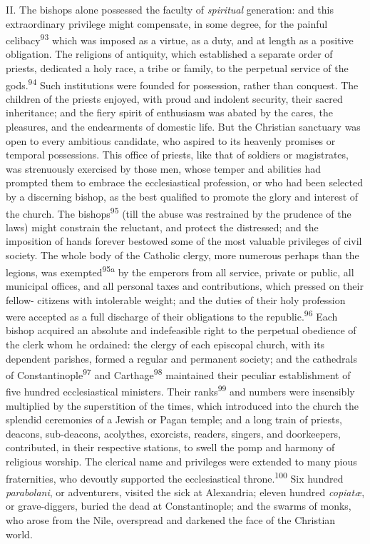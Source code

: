 II. The bishops alone possessed the faculty of \textit{spiritual} generation:
and this extraordinary privilege might compensate, in some degree, for
the painful celibacy\textsuperscript{93} which was imposed as a virtue, as a duty, and
at length as a positive obligation. The religions of antiquity, which
established a separate order of priests, dedicated a holy race, a tribe
or family, to the perpetual service of the gods.\textsuperscript{94} Such institutions
were founded for possession, rather than conquest. The children of the
priests enjoyed, with proud and indolent security, their sacred
inheritance; and the fiery spirit of enthusiasm was abated by the
cares, the pleasures, and the endearments of domestic life. But the
Christian sanctuary was open to every ambitious candidate, who aspired
to its heavenly promises or temporal possessions. This office of
priests, like that of soldiers or magistrates, was strenuously
exercised by those men, whose temper and abilities had prompted them to
embrace the ecclesiastical profession, or who had been selected by a
discerning bishop, as the best qualified to promote the glory and
interest of the church. The bishops\textsuperscript{95} (till the abuse was restrained
by the prudence of the laws) might constrain the reluctant, and protect
the distressed; and the imposition of hands forever bestowed some of
the most valuable privileges of civil society. The whole body of the
Catholic clergy, more numerous perhaps than the legions, was exempted\textsuperscript{95a}
by the emperors from all service, private or public, all
municipal offices, and all personal taxes and contributions, which
pressed on their fellow- citizens with intolerable weight; and the
duties of their holy profession were accepted as a full discharge of
their obligations to the republic.\textsuperscript{96} Each bishop acquired an absolute
and indefeasible right to the perpetual obedience of the clerk whom he
ordained: the clergy of each episcopal church, with its dependent
parishes, formed a regular and permanent society; and the cathedrals of
Constantinople\textsuperscript{97} and Carthage\textsuperscript{98} maintained their peculiar
establishment of five hundred ecclesiastical ministers. Their ranks\textsuperscript{99}
and numbers were insensibly multiplied by the superstition of the
times, which introduced into the church the splendid ceremonies of a
Jewish or Pagan temple; and a long train of priests, deacons,
sub-deacons, acolythes, exorcists, readers, singers, and doorkeepers,
contributed, in their respective stations, to swell the pomp and
harmony of religious worship. The clerical name and privileges were
extended to many pious fraternities, who devoutly supported the
ecclesiastical throne.\textsuperscript{100} Six hundred \textit{parabolani}, or adventurers,
visited the sick at Alexandria; eleven hundred \textit{copiatæ}, or
grave-diggers, buried the dead at Constantinople; and the swarms of
monks, who arose from the Nile, overspread and darkened the face of the
Christian world.

